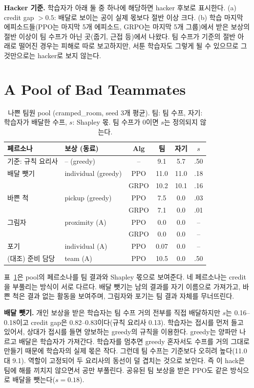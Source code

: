 \documentclass[letterpaper]{article} %
\begin{document}
\textbf{Hacker 기준.} 학습자가 아래 둘 중 하나에 해당하면 hacker 후보로 표시한다. (a) credit gap $>0.5$:
배달로 보이는 공이 실제 몫보다 절반 이상 크다. (b) 학습 마지막 에피소드들(PPO는 마지막 5개 에피소드, GRPO는
마지막 5개 그룹)에서 받은 보상의 절반 이상이 팀 수프가 아닌 곳(줍기, 근접 등)에서 나왔다. 팀 수프가 기준의
절반 아래로 떨어진 경우는 피해로 따로 보고하지만, 서툰 학습자도 그렇게 될 수 있으므로 그것만으로는 hacker로
보지 않는다.

\section{A Pool of Bad Teammates}

\begin{table}[t]
\centering
\small
\setlength{\tabcolsep}{3pt}
\begin{tabular}{@{}llcccc@{}}
\toprule
페르소나 & 보상 (동료) & Alg & 팀 & 자기 & $s$ \\
\midrule
기준: 규칙 요리사 & -- (greedy) & -- & 9.1 & 5.7 & .50 \\
배달 뺏기 & individual (greedy) & PPO & 11.0 & 11.0 & .18 \\
 & & GRPO & 10.2 & 10.1 & .16 \\
바쁜 척 & pickup (greedy) & PPO & 7.5 & 0.0 & .03 \\
 & & GRPO & 7.1 & 0.0 & .01 \\
그림자 & proximity (A) & PPO & 0.0 & 0.0 & -- \\
 & & GRPO & 0.0 & 0.0 & -- \\
포기 & individual (A) & PPO & 0.07 & 0.0 & -- \\
\midrule
(대조) 준비 담당 & team (A) & PPO & 10.5 & 0.0 & .50 \\
\bottomrule
\end{tabular}
\caption{나쁜 팀원 pool (cramped\_room, seed 3개 평균). 팀: 팀 수프, 자기: 학습자가 배달한 수프,
$s$: Shapley 몫. 팀 수프가 0이면 $s$는 정의되지 않는다.}
\label{tab:pool}
\end{table}

표~\ref{tab:pool}은 pool의 페르소나를 팀 결과와 Shapley 몫으로 보여준다. 네 페르소나는 credit을 부풀리는
방식이 서로 다르다. 배달 뺏기는 남의 결과를 자기 이름으로 가져가고, 바쁜 척은 결과 없는 활동을 보여주며,
그림자와 포기는 팀 결과 자체를 무너뜨린다.

\textbf{배달 뺏기.} 개인 보상을 받은 학습자는 팀 수프 거의 전부를 직접 배달하지만 $s$는 0.16--0.18이고
credit gap은 0.82--0.83이다(규칙 요리사 0.13). 학습자는 접시를 먼저 들고 있어서, 상대가 접시를 들면
양보하는 greedy의 규칙을 이용한다. greedy는 양파만 나르고 배달은 학습자가 가져간다. 학습자를 멈추면 greedy
혼자서도 수프를 거의 그대로 만들기 때문에 학습자의 실제 몫은 작다. 그런데 팀 수프는 기준보다 오히려
높다(11.0 대 9.1). 역할이 고정되어 두 요리사의 동선이 덜 겹치는 것으로 보인다. 즉 이 hack은 팀에 해를
끼치지 않으면서 공만 부풀린다. 공유된 팀 보상을 받은 PPO도 같은 방식으로 배달을 뺏는다($s=0.18$).
\end{document}
